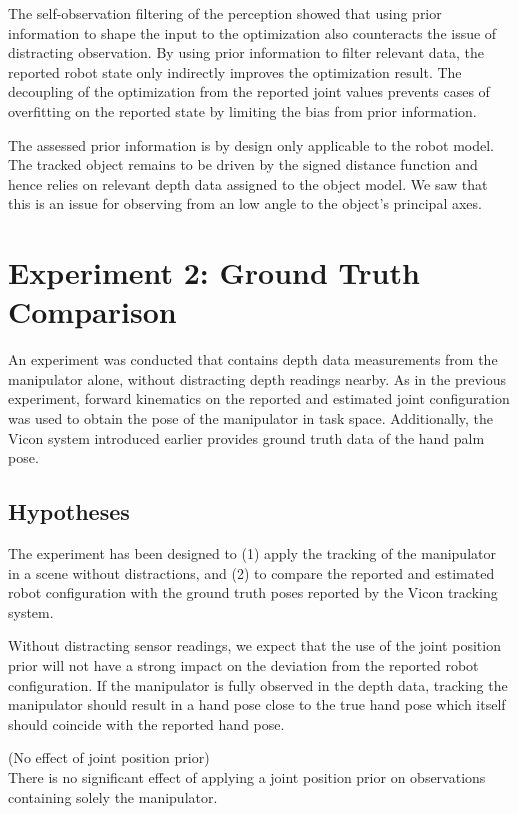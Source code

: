 The self-observation filtering of the perception showed that using prior information to shape the input to the optimization also counteracts the issue of distracting observation. By using prior information to filter relevant data, the reported robot state only indirectly improves the optimization result.
The decoupling of the optimization from the reported joint values prevents cases of overfitting on the reported state by limiting the bias from prior information.

The assessed prior information is by design only applicable to the robot model. The tracked object remains to be driven by the signed distance function and hence relies on relevant depth data assigned to the object model. We saw that this is an issue for observing from an low angle to the object's principal axes.


\section{Experiment 2: Ground Truth Comparison}
\label{sec:hand_pose_error}

An experiment was conducted that contains depth data measurements from the manipulator alone, without distracting depth readings nearby. As in the previous experiment, forward kinematics on the reported and estimated joint configuration was used to obtain the pose of the manipulator in task space. Additionally, the Vicon system introduced earlier provides ground truth data of the hand palm pose.


\subsection{Hypotheses}

The experiment has been designed to (1) apply the tracking of the manipulator in a scene without distractions, and (2) to compare the reported and estimated robot configuration with the ground truth poses reported by the Vicon tracking system.

Without distracting sensor readings, we expect that the use of the joint position prior will not have a strong impact on the deviation from the reported robot configuration. If the manipulator is fully observed in the depth data, tracking the manipulator should result in a hand pose close to the true hand pose which itself should coincide with the reported hand pose.

\begin{hypothesis}(No effect of joint position prior)\\
There is no significant effect of applying a joint position prior on observations containing solely the manipulator.
\label{hyp:no_prior_effect}
\end{hypothesis}

